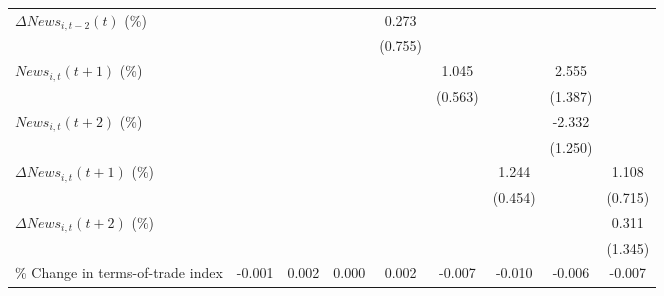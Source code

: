 {\begin{tabular}{l*{8}{c}}
\addlinespace
$ \Delta News_{i,t-2}(t)$ (\%)&                     &                     &                     &       0.273         &                     &                     &                     &                     \\
                    &                     &                     &                     &     (0.755)         &                     &                     &                     &                     \\
\addlinespace
$ News_{i,t}(t+1)$ (\%)&                     &                     &                     &                     &       1.045\sym{*}  &                     &       2.555\sym{*}  &                     \\
                    &                     &                     &                     &                     &     (0.563)         &                     &     (1.387)         &                     \\
\addlinespace
$ News_{i,t}(t+2)$ (\%)&                     &                     &                     &                     &                     &                     &      -2.332\sym{*}  &                     \\
                    &                     &                     &                     &                     &                     &                     &     (1.250)         &                     \\
\addlinespace
$ \Delta News_{i,t}(t+1)$ (\%)&                     &                     &                     &                     &                     &       1.244\sym{***}&                     &       1.108         \\
                    &                     &                     &                     &                     &                     &     (0.454)         &                     &     (0.715)         \\
\addlinespace
$ \Delta News_{i,t}(t+2)$ (\%)&                     &                     &                     &                     &                     &                     &                     &       0.311         \\
                    &                     &                     &                     &                     &                     &                     &                     &     (1.345)         \\
\addlinespace
\% Change in terms-of-trade index&      -0.001         &       0.002         &       0.000         &       0.002         &      -0.007         &      -0.010         &      -0.006         &      -0.007         \\

\end{tabular}}

